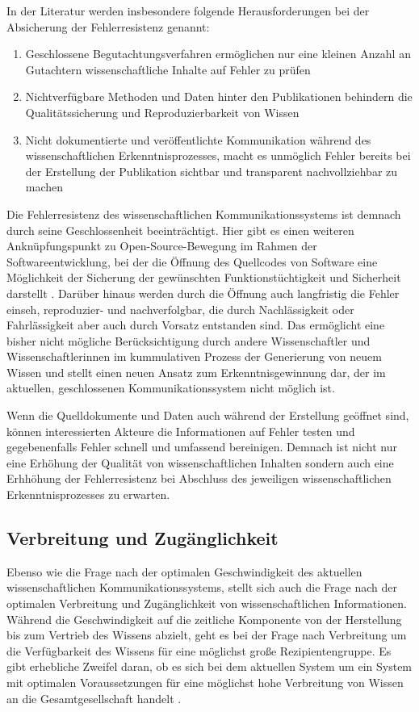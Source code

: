 In der Literatur werden insbesondere folgende Herausforderungen bei der Absicherung der Fehlerresistenz genannt:
\begin{enumerate}
\item Geschlossene Begutachtungsverfahren ermöglichen nur eine kleinen Anzahl an Gutachtern wissenschaftliche Inhalte auf Fehler zu prüfen \cite{suchen}
\item Nichtverfügbare Methoden und Daten hinter den Publikationen behindern die Qualitätssicherung und Reproduzierbarkeit von Wissen \cite{suchen}
\item Nicht dokumentierte und veröffentlichte Kommunikation während des wissenschaftlichen Erkenntnisprozesses, macht es unmöglich Fehler bereits bei der Erstellung der Publikation sichtbar und transparent nachvollziehbar zu machen \cite{suchen}
\end{enumerate}

Die Fehlerresistenz des wissenschaftlichen Kommunikationssystems ist demnach durch seine Geschlossenheit beeinträchtigt. Hier gibt es einen weiteren Anknüpfungspunkt zu Open-Source-Bewegung im Rahmen der Softwareentwicklung, bei der die Öffnung des Quellcodes von Software eine Möglichkeit der Sicherung der gewünschten Funktionstüchtigkeit und Sicherheit darstellt \cite{hoepman_2007_increased}. Darüber hinaus werden durch die Öffnung auch langfristig die Fehler einseh, reproduzier- und nachverfolgbar, die durch Nachlässigkeit oder Fahrlässigkeit aber auch durch Vorsatz entstanden sind. Das ermöglicht eine bisher nicht mögliche Berücksichtigung durch andere Wissenschaftler und Wissenschaftlerinnen im kummulativen Prozess der Generierung von neuem Wissen und stellt einen neuen Ansatz zum Erkenntnisgewinnung dar, der im aktuellen, geschlossenen Kommunikationssystem nicht möglich ist.

Wenn die Quelldokumente und Daten auch während der Erstellung geöffnet sind, können interessierten Akteure die Informationen auf Fehler testen und gegebenenfalls Fehler schnell und umfassend bereinigen. Demnach ist nicht nur eine Erhöhung der Qualität von wissenschaftlichen Inhalten sondern auch eine Erhhöhung der Fehlerresistenz bei Abschluss des jeweiligen wissenschaftlichen Erkenntnisprozesses zu erwarten.

\subsection{Verbreitung und Zugänglichkeit}

Ebenso wie die Frage nach der optimalen Geschwindigkeit des aktuellen wissenschaftlichen Kommunikationssystems, stellt sich auch die Frage nach der optimalen Verbreitung und Zugänglichkeit von wissenschaftlichen Informationen. Während die Geschwindigkeit auf die zeitliche Komponente von der Herstellung bis zum Vertrieb des Wissens abzielt, geht es bei der Frage nach Verbreitung um die Verfügbarkeit des Wissens für eine möglichst große Rezipientengruppe. Es gibt erhebliche Zweifel daran, ob es sich bei dem aktuellen System um ein System mit optimalen Voraussetzungen für eine möglichst hohe Verbreitung von Wissen an die Gesamtgesellschaft handelt \cite{suchen}.

